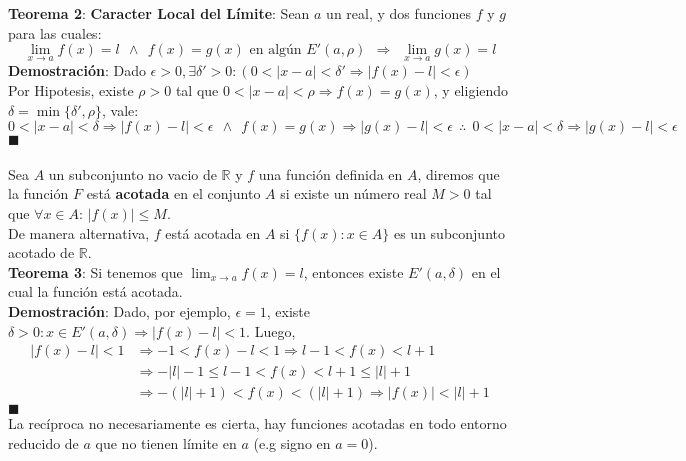 \documentclass[11pt,a4paper]{article}
\newcommand*{\QEDA}{\null\nobreak\hfill\ensuremath{\blacksquare}}
\begin{document}
\noindent \textbf{Teorema 2}: \textbf{Caracter Local del L\'imite}: Sean $a$ un real, y dos funciones $f$ y $g$ para las cuales:
$$\lim_{x\to a}f(x) = l \ \ \land \ \ f(x) = g(x) \text{ en alg\'un } E'(a, \rho) \ \ \Rightarrow \ \ \lim_{x\to a}g(x) = l$$
\textbf{Demostraci\'on}: Dado $\epsilon>0, \exists \delta'>0 : (0<|x-a|<\delta' \Rightarrow |f(x)-l|<\epsilon)$\\
Por Hipotesis, existe $\rho > 0$ tal que $0<|x-a|<\rho \Rightarrow f(x)=g(x)$, y eligiendo $\delta = \min\{\delta', \rho\}$, vale:
$$0<|x-a|<\delta \Rightarrow |f(x)-l|<\epsilon \ \ \land \ \ f(x)=g(x) \Rightarrow |g(x)-l|<\epsilon \ \ \therefore \ \ 0<|x-a|<\delta \Rightarrow |g(x)-l|<\epsilon$$ \QEDA \\

\noindent \dotfill\\

Sea $A$ un subconjunto no vacio de $\mathbb{R}$ y $f$ una funci\'on definida en $A$, diremos que la funci\'on $F$ est\'a \textbf{acotada} en el conjunto $A$ si existe un n\'umero real $M > 0$ tal que $\forall x \in A$: $|f(x)| \leq M$.\\
\indent De manera alternativa, $f$ est\'a acotada en $A$ si $\{f(x):x\in A\}$ es un subconjunto acotado de $\mathbb{R}$.\\

\noindent \textbf{Teorema 3}: Si tenemos que $\displaystyle{\lim_{x\to a}f(x) = l}$, entonces existe $E'(a,\delta)$ en el cual la funci\'on est\'a acotada.\\
\noindent \textbf{Demostraci\'on}: Dado, por ejemplo, $\epsilon=1$, existe $\delta>0 : x\in E'(a,\delta) \Rightarrow |f(x)-l|<1$. Luego, 
\begin{align*}
|f(x)-l| < 1 & \Rightarrow -1 < f(x)-l < 1 \Rightarrow l-1<f(x)<l+1\\
& \Rightarrow -|l|-1 \leq l-1<f(x)<l+1\leq|l|+1\\
& \Rightarrow -(|l|+1) < f(x) < (|l|+1) \Rightarrow |f(x)|<|l|+1
\end{align*}
\QEDA\\

La rec\'iproca no necesariamente es cierta, hay funciones acotadas en todo entorno reducido de $a$ que no tienen l\'imite en $a$ (e.g signo en $a=0$).

\newpage
\end{document}
